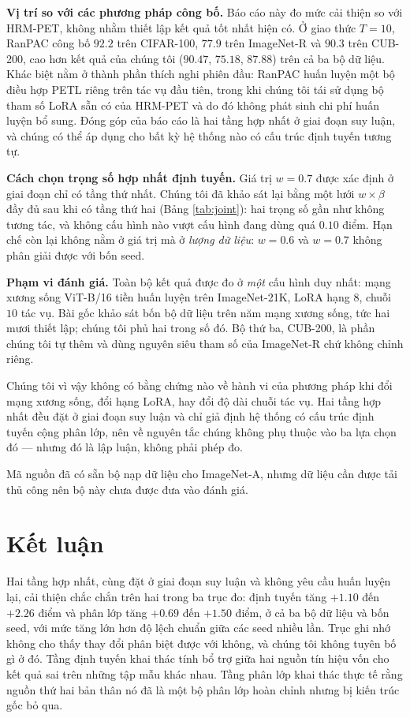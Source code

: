\documentclass[11pt,a4paper]{article}
\begin{document}
\textbf{Vị trí so với các phương pháp công bố.} Báo cáo này đo mức cải thiện so
với HRM-PET, không nhằm thiết lập kết quả tốt nhất hiện có. Ở giao thức $T = 10$,
RanPAC công bố $92.2$ trên CIFAR-100, $77.9$ trên ImageNet-R và $90.3$ trên
CUB-200, cao hơn kết quả của chúng tôi ($90.47$, $75.18$, $87.88$) trên cả ba bộ
dữ liệu. Khác biệt nằm ở thành phần thích nghi phiên đầu: RanPAC huấn luyện một
bộ điều hợp PETL riêng trên tác vụ đầu tiên, trong khi chúng tôi tái sử dụng bộ
tham số LoRA sẵn có của HRM-PET và do đó không phát sinh chi phí huấn luyện bổ
sung. Đóng góp của báo cáo là hai tầng hợp nhất ở giai đoạn suy luận, và chúng có
thể áp dụng cho bất kỳ hệ thống nào có cấu trúc định tuyến tương tự.

\textbf{Cách chọn trọng số hợp nhất định tuyến.} Giá trị $w = 0.7$ được xác định
ở giai đoạn chỉ có tầng thứ nhất. Chúng tôi đã khảo sát lại bằng một lưới
$w \times \beta$ đầy đủ sau khi có tầng thứ hai (Bảng \ref{tab:joint}): hai
trọng số gần như không tương tác, và không cấu hình nào vượt cấu hình đang dùng
quá $0.10$ điểm. Hạn chế còn lại không nằm ở giá trị mà ở \emph{lượng dữ liệu}:
$w = 0.6$ và $w = 0.7$ không phân giải được với bốn seed.

\textbf{Phạm vi đánh giá.} Toàn bộ kết quả được đo ở \emph{một}
cấu hình duy nhất: mạng xương sống ViT-B/16 tiền huấn luyện trên ImageNet-21K,
LoRA hạng $8$, chuỗi $10$ tác vụ. Bài gốc khảo sát bốn bộ dữ liệu trên năm mạng
xương sống, tức hai mươi thiết lập; chúng tôi phủ hai trong số đó. Bộ thứ ba,
CUB-200, là phần chúng tôi tự thêm và dùng nguyên siêu tham số của ImageNet-R
chứ không chỉnh riêng.

Chúng tôi vì vậy không có bằng chứng nào về hành vi của phương pháp khi đổi mạng
xương sống, đổi hạng LoRA, hay đổi độ dài chuỗi tác vụ. Hai tầng hợp nhất đều
đặt ở giai đoạn suy luận và chỉ giả định hệ thống có cấu trúc định tuyến cộng
phân lớp, nên về nguyên tắc chúng không phụ thuộc vào ba lựa chọn đó --- nhưng
đó là lập luận, không phải phép đo.

Mã nguồn đã có sẵn bộ nạp dữ liệu cho ImageNet-A, nhưng dữ liệu cần được tải thủ
công nên bộ này chưa được đưa vào đánh giá.

\section{Kết luận}

Hai tầng hợp nhất, cùng đặt ở giai đoạn suy luận và không yêu cầu huấn luyện
lại, cải thiện chắc chắn trên hai trong ba trục đo: định tuyến tăng $+1.10$ đến
$+2.26$ điểm và phân lớp tăng $+0.69$ đến $+1.50$ điểm, ở cả ba bộ dữ liệu và
bốn seed, với mức tăng lớn hơn độ lệch chuẩn giữa các seed nhiều lần. Trục ghi
nhớ không cho thấy thay đổi phân biệt được với không, và chúng tôi không tuyên
bố gì ở đó. Tầng định tuyến khai thác tính bổ trợ giữa hai nguồn tín hiệu vốn
cho kết quả sai trên những tập mẫu khác nhau. Tầng phân lớp khai thác thực tế rằng nguồn thứ hai
bản thân nó đã là một bộ phân lớp hoàn chỉnh nhưng bị kiến trúc gốc bỏ qua.
\end{document}
